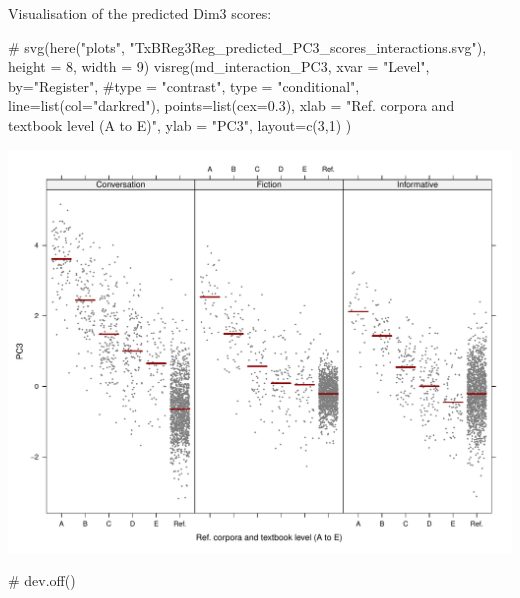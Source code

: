 \documentclass[
  letterpaper,
  DIV=11,
  numbers=noendperiod]{scrreprt}
\newenvironment{Shaded}{\begin{snugshade}}{\end{snugshade}}
\newcommand{\AttributeTok}[1]{\textcolor[rgb]{0.40,0.45,0.13}{#1}}
\newcommand{\CommentTok}[1]{\textcolor[rgb]{0.37,0.37,0.37}{#1}}
\newcommand{\DecValTok}[1]{\textcolor[rgb]{0.68,0.00,0.00}{#1}}
\newcommand{\FloatTok}[1]{\textcolor[rgb]{0.68,0.00,0.00}{#1}}
\newcommand{\FunctionTok}[1]{\textcolor[rgb]{0.28,0.35,0.67}{#1}}
\newcommand{\NormalTok}[1]{\textcolor[rgb]{0.00,0.23,0.31}{#1}}
\newcommand{\StringTok}[1]{\textcolor[rgb]{0.13,0.47,0.30}{#1}}
\begin{document}
Visualisation of the predicted Dim3 scores:

\begin{Shaded}
\begin{Highlighting}[]
\CommentTok{\# svg(here("plots", "TxBReg3Reg\_predicted\_PC3\_scores\_interactions.svg"), height = 8, width = 9)}
\FunctionTok{visreg}\NormalTok{(md\_interaction\_PC3, }\AttributeTok{xvar =} \StringTok{"Level"}\NormalTok{, }\AttributeTok{by=}\StringTok{"Register"}\NormalTok{, }
       \CommentTok{\#type = "contrast",}
       \AttributeTok{type =} \StringTok{"conditional"}\NormalTok{,}
       \AttributeTok{line=}\FunctionTok{list}\NormalTok{(}\AttributeTok{col=}\StringTok{"darkred"}\NormalTok{), }
       \AttributeTok{points=}\FunctionTok{list}\NormalTok{(}\AttributeTok{cex=}\FloatTok{0.3}\NormalTok{),}
       \AttributeTok{xlab =} \StringTok{"Ref. corpora and textbook level (A to E)"}\NormalTok{, }\AttributeTok{ylab =} \StringTok{"PC3"}\NormalTok{,}
       \AttributeTok{layout=}\FunctionTok{c}\NormalTok{(}\DecValTok{3}\NormalTok{,}\DecValTok{1}\NormalTok{)}
\NormalTok{)}
\end{Highlighting}
\end{Shaded}

\includegraphics{G_Ch7_Analysis_files/figure-pdf/Dim3estimateplots-1.pdf}

\begin{Shaded}
\begin{Highlighting}[]
\CommentTok{\# dev.off()}
\end{Highlighting}
\end{Shaded}
\end{document}
